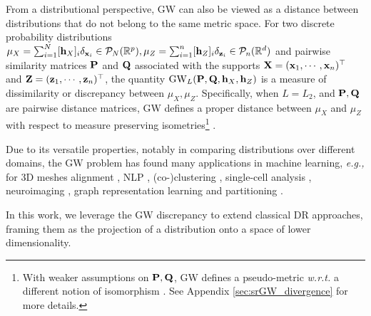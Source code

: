 From a distributional perspective, GW can also be viewed as a distance between distributions that do not belong to the same metric space. For two discrete probability distributions $\mu_X = \sum_{i=1}^N [{\mathbf{h}}_X]_i \delta_{{\mathbf{x}}_i} \in {\mathcal{P}}_N(\mathbb{R}^{p}), \mu_Z =\sum_{i=1}^n [{\mathbf{h}}_Z]_i \delta_{{\mathbf{z}}_i} \in {\mathcal{P}}_n(\mathbb{R}^d)$ and pairwise similarity matrices ${\mathbf{P}}$ and ${\mathbf{Q}}$ associated with the supports ${\mathbf{X}} = ({\mathbf{x}}_1, \cdots, {\mathbf{x}}_n)^\top$ and ${\mathbf{Z}} = ({\mathbf{z}}_1, \cdots, {\mathbf{z}}_n)^\top$, the quantity $\operatorname{GW}_L ({\mathbf{P}}, {\mathbf{Q}}, {\mathbf{h}}_X, {\mathbf{h}}_Z)$ is a measure of dissimilarity or discrepancy between $\mu_X, \mu_Z$. Specifically, when $L=L_2$, and ${\mathbf{P}}, {\mathbf{Q}}$ are pairwise distance matrices, GW defines a proper distance between $\mu_X$ and $\mu_Z$ with respect to measure preserving isometries\footnote{With weaker assumptions on ${\mathbf{P}}, {\mathbf{Q}}$, GW defines a pseudo-metric \textit{w.r.t.} a different notion of isomorphism \citep{chowdhury2019gromov}. See Appendix \ref{sec:srGW_divergence} for more details.} \citep{memoli2011gromov}. 

Due to its versatile properties, notably in comparing distributions over different domains,  the GW problem has found many applications in machine learning, \textit{e.g.,} for 3D meshes alignment \citep{solomon2016entropic,ezuz2017gwcnn}, NLP \citep{alvarez2018gromov}, (co-)clustering  \citep{peyre2016gromov, redko2020co}, single-cell analysis \citep{demetci2020gromov}, neuroimaging \citep{thual2022aligning}, graph representation learning \citep{xu2020gromov, vincent2021online, liu2022robust, vincent2022template, pmlr-v202-zeng23c} and partitioning \citep{xu2019scalable, chowdhury2021generalized}.

In this work, we leverage the GW discrepancy to extend classical DR approaches, framing them as the projection of a distribution onto a space of lower dimensionality. 